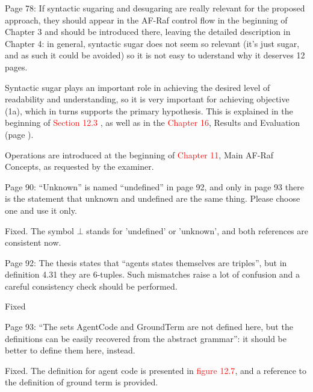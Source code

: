 \documentclass{article}
\newcommand*\R[1]{\textcolor{red}{#1}} %
\newenvironment{them}{\noindent\begingroup\color{blue}}{\endgroup\par}
\begin{document}
\begin{them}

Page 78:
If syntactic sugaring and desugaring are really relevant for the proposed
approach, they should appear in the AF-Raf control flow in the beginning of
Chapter 3 and should be introduced there, leaving the detailed description in
Chapter 4: in general, syntactic sugar does not seem so relevant (it's just
sugar, and as such it could be avoided) so it is not easy to uderstand why it
deserves 12 pages.

\end{them}

Syntactic sugar plays an important role in achieving the desired level of
readability and understanding, so it is very important for achieving objective
(1a), which in turns supports the primary hypothesis. This is explained in the
beginning of \R{Section 12.3} , as well as in the \R{Chapter 16}, Results and
Evaluation (page ).

Operations are introduced at the beginning of \R{Chapter 11}, Main AF-Raf
Concepts, as requested by the examiner.

\begin{them}

Page 90:
“Unknown” is named “undefined” in page 92, and only in page 93 there is the
statement that unknown and undefined are the same thing. Please choose one and
use it only.

\end{them}
Fixed. The symbol $\bot$ stands for 'undefined' or 'unknown', and both
references are consistent now. 

\begin{them}

Page 92:
The thesis states that “agents states themselves are triples”, but in
definition 4.31 they are 6-tuples.  Such mismatches raise a lot of confusion
and a careful consistency check should be performed.

\end{them}
Fixed

\begin{them}

Page 93:
“The sets AgentCode and GroundTerm are not defined here, but the definitions
can be easily recovered from the abstract grammar”: it should be better to
define them here, instead.

\end{them}
Fixed. The definition for agent code is presented in \R{figure 12.7}, and a
reference to the definition of ground term is provided.
\end{document}
